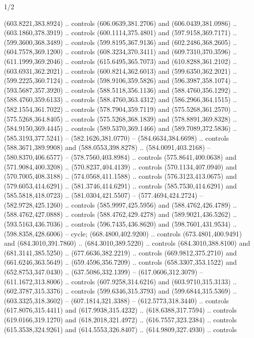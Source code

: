 \begin{flagdescription}{1/2}
\begin{scope}[shift={(2*\flaglength/3-0.25*\rb,0.51333\flagwidth)},scale=0.001715\flagwidth*\stretchfactor]
\begin{scope}[y=-1pt, x=1pt,cm={{1.04354,0.0,0.0,1.01818,(-827,-297)}}]
\begin{scope}[draw=black,line width=0.015\flagwidth]
\begin{scope}[fill=gold]
  (603.8221,383.8924) .. controls (606.0639,381.2706) and (606.0439,381.0986) ..
  (603.1860,378.3919) .. controls (600.1114,375.4801) and (597.9158,369.7171) ..
  (599.3600,368.3489) .. controls (599.8195,367.9136) and (602.2486,368.2605) ..
  (604.7578,369.1200) .. controls (608.3234,370.3411) and (609.7310,370.3596) ..
  (611.1999,369.2046) .. controls (615.6495,365.7073) and (610.8288,361.2102) ..
  (603.6931,362.2021) .. controls (600.8214,362.6013) and (599.6350,362.2021) ..
  (599.2225,360.7124) .. controls (598.9106,359.5826) and (596.3987,358.1074) ..
  (593.5687,357.3920) .. controls (588.5118,356.1136) and (588.4760,356.1292) ..
  (588.4760,359.6133) .. controls (588.4760,363.4312) and (586.2966,364.1515) ..
  (582.1554,361.7022) .. controls (578.7904,359.7119) and (575.5268,361.2570) ..
  (575.5268,364.8405) .. controls (575.5268,368.1839) and (578.8891,369.8328) ..
  (584.9150,369.4445) .. controls (589.5370,369.1466) and (589.7089,372.5836) ..
  (585.3193,377.5241) -- (582.1626,381.0770) -- (584.6634,384.6698) .. controls
  (588.3671,389.9908) and (588.0553,398.8278) .. (584.0091,403.2168) --
  (580.8370,406.6577) -- (578.7560,403.8984) .. controls (575.8641,400.0638) and
  (571.9084,400.3208) .. (570.8237,404.4139) .. controls (570.1134,407.0940) and
  (570.7005,408.3188) .. (574.0568,411.1588) .. controls (576.3123,413.0675) and
  (579.6053,414.6291) .. (581.3746,414.6291) .. controls (585.7530,414.6291) and
  (585.5818,418.0723) .. (581.0304,421.5507) -- (577.4694,424.2724) --
  (582.9728,425.1260) .. controls (585.9997,425.5956) and (588.4762,426.4789) ..
  (588.4762,427.0888) .. controls (588.4762,429.4278) and (589.9021,436.5262) ..
  (593.5163,436.7036) .. controls (596.7435,436.8620) and (598.7601,431.9534) ..
  (598.8358,428.6006) -- cycle;
 (668.4800,402.9200) .. controls (673.4801,400.9491) and
  (684.3010,391.7860) .. (684.3010,389.5220) .. controls (684.3010,388.8100) and
  (681.3141,385.5250) .. (677.6636,382.2219) .. controls (669.9812,375.2710) and
  (661.6246,363.5649) .. (659.4596,356.7209) .. controls (658.3307,353.1522) and
  (652.8753,347.0430) .. (637.5086,332.1399) -- (617.0606,312.3079) --
  (611.1672,313.8006) .. controls (607.9258,314.6216) and (603.9710,315.3133) ..
  (602.3787,315.3376) .. controls (599.6346,315.3793) and (599.6844,315.5369) ..
  (603.3325,318.3602) -- (607.1814,321.3388) -- (612.5773,318.3440) .. controls
  (617.8076,315.4411) and (617.9938,315.4232) .. (618.6388,317.7594) .. controls
  (619.0166,319.1270) and (618.2018,321.4972) .. (616.7557,323.2384) .. controls
  (615.3538,324.9261) and (614.5553,326.8407) .. (614.9809,327.4930) .. controls

\end{scope}
\end{scope}
\end{scope}
\end{scope}
\end{flagdescription}
